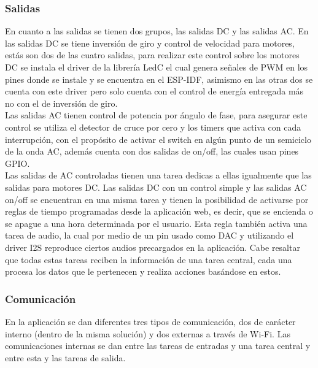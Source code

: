 \subsubsection{Salidas}

En cuanto a las salidas se tienen dos grupos, las salidas DC y las salidas AC. En las salidas DC se tiene inversión de giro y control de velocidad para motores, estás son dos de las cuatro salidas, para realizar este control sobre los motores DC se instala el driver de la librería LedC el cual genera señales de PWM en los pines donde se instale y se encuentra en el ESP-IDF, asimismo en las otras dos se cuenta con este driver pero solo cuenta con el control de energía entregada más no con el de inversión de giro. \\

Las salidas AC tienen control de potencia por ángulo de fase, para asegurar este control se utiliza el detector de cruce por cero y los timers que activa con cada interrupción, con el propósito de activar el switch en algún punto de un semiciclo de la onda AC, además cuenta con dos salidas de on/off, las cuales usan pines GPIO.\\

Las salidas de AC controladas tienen una tarea dedicas a ellas igualmente que las salidas para motores DC. Las salidas DC con un control simple y las salidas AC on/off se encuentran en una misma tarea y tienen la posibilidad de activarse por reglas de tiempo programadas desde la aplicación web, es decir, que se encienda o se apague a una hora determinada por el usuario. Esta regla también activa una tarea de audio, la cual por medio de un pin usado como DAC y utilizando el driver I2S reproduce ciertos audios precargados en la aplicación. Cabe resaltar que todas estas tareas reciben la información de una tarea central, cada una procesa los datos que le pertenecen y realiza acciones basándose en estos.\\

\subsubsection{Comunicación}

En la aplicación se dan diferentes tres tipos de comunicación, dos de carácter interno (dentro de la misma solución) y dos externas a través de Wi-Fi. Las comunicaciones internas se dan entre las tareas de entradas y una tarea central y entre esta y las tareas de salida.\\

